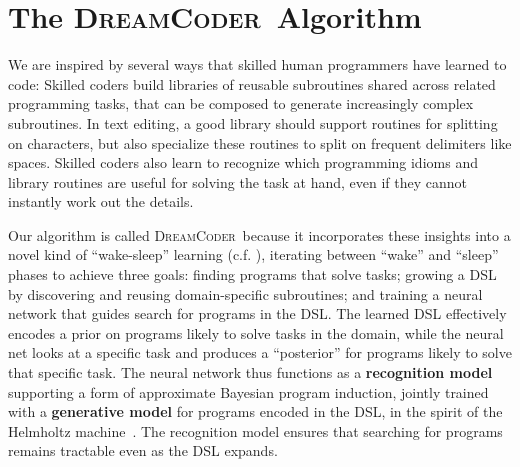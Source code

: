 \documentclass{article}
\newcommand{\system}{\textsc{DreamCoder}~}
\begin{document}
\section{The \system Algorithm}

We are inspired by several ways that skilled human
programmers have learned to code: Skilled coders build libraries of
reusable subroutines shared across related programming tasks,
that can be composed to generate increasingly complex
subroutines.  In text editing, a good library should support routines
for splitting on characters, but also specialize these routines to
split on frequent delimiters like spaces. Skilled coders
also learn to recognize which programming idioms and library
routines are useful for solving the task at hand, even if they
cannot instantly work out the details.  %

Our algorithm is called \system because it incorporates these insights into a
novel kind of ``wake-sleep'' learning (c.f. \citep{hinton1995wake}), iterating
between ``wake'' and ``sleep'' phases to achieve three goals: finding
programs that solve tasks; growing a DSL by discovering
and reusing domain-specific subroutines; and training a neural network
that  guides search for programs in the DSL.
The learned DSL effectively encodes a prior on programs likely to
solve tasks in the domain, while the neural net looks at %
a specific task and produces a ``posterior''
for programs likely to solve that specific task.  The neural network
thus functions as a \textbf{recognition model} supporting a form of
approximate Bayesian program induction, jointly trained with a
\textbf{generative model} for programs encoded in the DSL, in the
spirit of the Helmholtz machine~\cite{hinton1995wake}. The
recognition model ensures that searching for programs remains
tractable even as the DSL 
expands.
\end{document}
